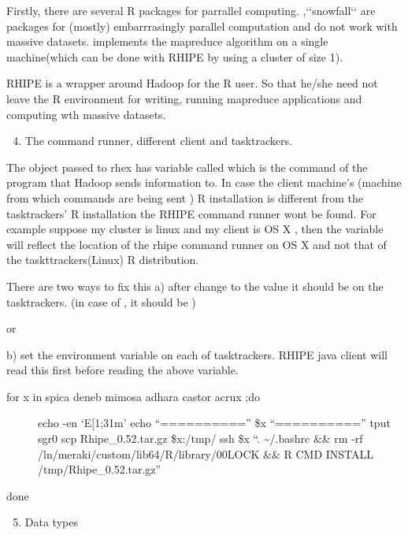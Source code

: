 \documentclass[letterpaper,10pt,english]{sphinxmanual}
\begin{document}
Firstly, there are several R packages for parrallel computing. ,{}`{}`snowfall{}`{}`
are packages for (mostly) embarrrasingly parallel computation and do not work
with massive datasets.  implements the mapreduce algorithm on a
single machine(which can be done with RHIPE by using a cluster of size 1).

RHIPE is a wrapper around Hadoop for the R user. So that he/she need not leave
the R environment for writing, running mapreduce applications and computing wth
massive datasets.
\begin{enumerate}
\setcounter{enumi}{3}
\item {} 
The command runner, different client and tasktrackers.

\end{enumerate}

The object passed to rhex has variable called  which is the
command of the program that Hadoop sends information to. In case the client
machine's (machine from which commands are being sent ) R installation is different from the
tasktrackers' R installation the RHIPE command runner wont be found. For example
suppose my cluster is linux and my client is OS X , then the 
variable will reflect the location of the rhipe command runner on OS X and not
that of the taskttrackers(Linux) R distribution.

There are two ways to fix this
a) after  change  to the
value it should be on the tasktrackers.
(in case of , it should be )

or

b) set the environment variable  on each of tasktrackers. RHIPE
java client will read this first before reading the above variable.
\begin{description}
\item[{for x in spica deneb mimosa adhara castor acrux ;do}] \leavevmode
echo -en `E{[}1;31m'
echo ``=========='' \$x ``==========''
tput sgr0
scp Rhipe\_0.52.tar.gz \$x:/tmp/
ssh \$x ``. \textasciitilde{}/.bashrc \&\& rm -rf /ln/meraki/custom/lib64/R/library/00LOCK \&\& R CMD INSTALL /tmp/Rhipe\_0.52.tar.gz''

\end{description}

done
\begin{enumerate}
\setcounter{enumi}{4}
\item {} 
Data types

\end{enumerate}
\end{document}
